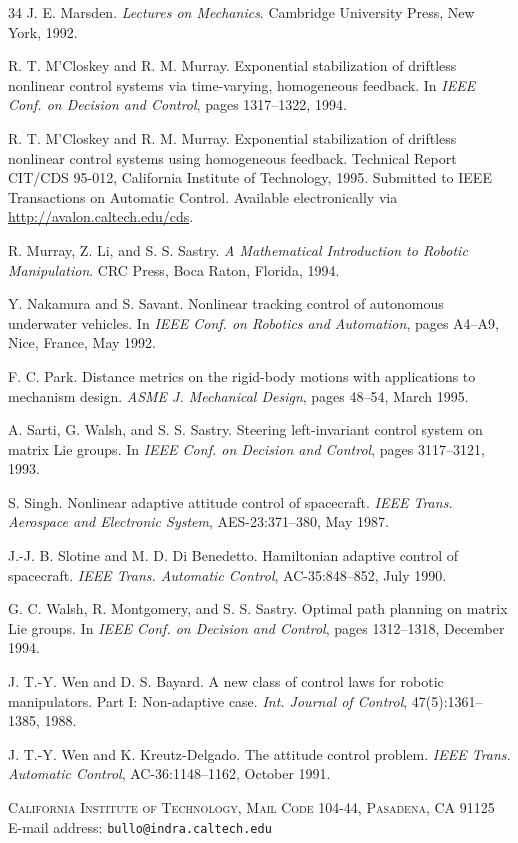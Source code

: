 \documentclass[11pt]{article}
\begin{document}
\begin{thebibliography}{34}
 J. E. Marsden. \emph{Lectures on Mechanics}. Cambridge University Press, New York, 1992.

 R. T. M'Closkey and R. M. Murray. Exponential stabilization of driftless nonlinear control systems via time-varying, homogeneous feedback. In \emph{IEEE Conf. on Decision and Control}, pages 1317--1322, 1994.

 R. T. M'Closkey and R. M. Murray. Exponential stabilization of driftless nonlinear control systems using homogeneous feedback. Technical Report CIT/CDS 95-012, California Institute of Technology, 1995. Submitted to IEEE Transactions on Automatic Control. Available electronically via \url{http://avalon.caltech.edu/cds}.

 R. Murray, Z. Li, and S. S. Sastry. \emph{A Mathematical Introduction to Robotic Manipulation}. CRC Press, Boca Raton, Florida, 1994.

 Y. Nakamura and S. Savant. Nonlinear tracking control of autonomous underwater vehicles. In \emph{IEEE Conf. on Robotics and Automation}, pages A4--A9, Nice, France, May 1992.

 F. C. Park. Distance metrics on the rigid-body motions with applications to mechanism design. \emph{ASME J. Mechanical Design}, pages 48--54, March 1995.

 A. Sarti, G. Walsh, and S. S. Sastry. Steering left-invariant control system on matrix Lie groups. In \emph{IEEE Conf. on Decision and Control}, pages 3117--3121, 1993.

 S. Singh. Nonlinear adaptive attitude control of spacecraft. \emph{IEEE Trans. Aerospace and Electronic System}, AES-23:371--380, May 1987.

 J.-J. B. Slotine and M. D. Di Benedetto. Hamiltonian adaptive control of spacecraft. \emph{IEEE Trans. Automatic Control}, AC-35:848--852, July 1990.

 G. C. Walsh, R. Montgomery, and S. S. Sastry. Optimal path planning on matrix Lie groups. In \emph{IEEE Conf. on Decision and Control}, pages 1312--1318, December 1994.

 J. T.-Y. Wen and D. S. Bayard. A new class of control laws for robotic manipulators. Part I: Non-adaptive case. \emph{Int. Journal of Control}, 47(5):1361--1385, 1988.

 J. T.-Y. Wen and K. Kreutz-Delgado. The attitude control problem. \emph{IEEE Trans. Automatic Control}, AC-36:1148--1162, October 1991.
\end{thebibliography}

\bigskip
\noindent\textsc{California Institute of Technology, Mail Code 104-44, Pasadena, CA 91125}\\
\noindent E-mail address: \texttt{bullo@indra.caltech.edu}
\end{document}
